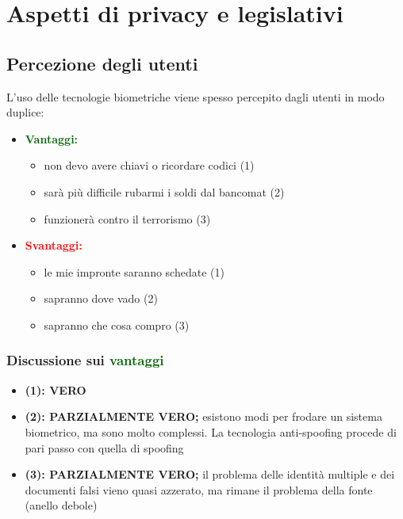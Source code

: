 \documentclass{report}
\begin{document}
\newpage


\chapter{Aspetti di privacy e legislativi}


\section{Percezione degli utenti}

L'uso delle tecnologie biometriche viene spesso percepito dagli utenti in modo duplice:
\begin{itemize}
    \item \textbf{\textcolor{darkgreen}{Vantaggi:}}
    \begin{itemize}
        \item non devo avere chiavi o ricordare codici (1)
        \item sarà più difficile rubarmi i soldi dal bancomat (2)
        \item funzionerà contro il terrorismo (3)
    \end{itemize}
    \item \textbf{\textcolor{red}{Svantaggi:}}
    \begin{itemize}
        \item le mie impronte saranno schedate (1)
        \item sapranno dove vado (2)
        \item sapranno che cosa compro (3)
    \end{itemize}
\end{itemize}

\subsection{Discussione sui \textcolor{darkgreen}{vantaggi}}
\begin{itemize}
    \item \textbf{(1): VERO}
    \item \textbf{(2): PARZIALMENTE VERO;} esistono modi per frodare un sistema biometrico, ma sono molto complessi. La tecnologia anti-spoofing procede di pari passo con quella di spoofing
    \item \textbf{(3): PARZIALMENTE VERO;} il problema delle identità multiple e dei documenti falsi vieno quasi azzerato, ma rimane il problema della fonte (anello debole)
\end{itemize}
\end{document}
